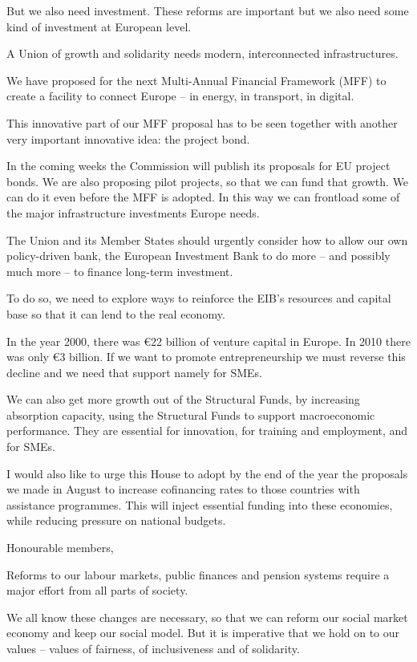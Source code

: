 \documentclass[a4paper,11pt]{article}
\begin{document}
But we also need investment. These reforms are important but we also need some kind of investment at European level.

A Union of growth and solidarity needs modern, interconnected infrastructures.

We have proposed for the next Multi-Annual Financial Framework (MFF) to create a facility to connect Europe – in energy, in transport, in digital.

This innovative part of our MFF proposal has to be seen together with another very important innovative idea: the project bond.

In the coming weeks the Commission will publish its proposals for EU project bonds. We are also proposing pilot projects, so that we can fund that growth. We can do it even before the MFF is adopted. In this way we can frontload some of the major infrastructure investments Europe needs.

The Union and its Member States should urgently consider how to allow our own policy-driven bank, the European Investment Bank to do more – and possibly much more – to finance long-term investment.

To do so, we need to explore ways to reinforce the EIB's resources and capital base so that it can lend to the real economy.

In the year 2000, there was \euro 22 billion of venture capital in Europe. In 2010 there was only \euro 3 billion. If we want to promote entrepreneurship we must reverse this decline and we need that support namely for SMEs.

We can also get more growth out of the Structural Funds, by increasing absorption capacity, using the Structural Funds to support macroeconomic performance. They are essential for innovation, for training and employment, and for SMEs.

I would also like to urge this House to adopt by the end of the year the proposals we made in August to increase cofinancing rates to those countries with assistance programmes. This will inject essential funding into these economies, while reducing pressure on national budgets.

Honourable members,

Reforms to our labour markets, public finances and pension systems require a major effort from all parts of society.

We all know these changes are necessary, so that we can reform our social market economy and keep our social model. But it is imperative that we hold on to our values – values of fairness, of inclusiveness and of solidarity.
\end{document}
